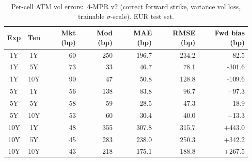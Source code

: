 \begin{table}[H]
\centering
\caption{Per-cell ATM vol errors: $\Lambda$-MPR v2 (correct forward strike, variance vol loss, trainable $\sigma$-scale). EUR test set.}
\label{tab:lambda_v2_per_cell}
\small
\begin{tabular}{@{}ccrrrrr@{}}
\toprule
\textbf{Exp} & \textbf{Ten} & \textbf{Mkt (bp)} & \textbf{Mod (bp)} & \textbf{MAE (bp)} & \textbf{RMSE (bp)} & \textbf{Fwd bias (bp)} \\
\midrule
  1Y & 1Y & 60 & 250 & 196.7 & 234.2 & -82.5 \\
  1Y & 5Y & 73 & 33 & 46.7 & 78.1 & -301.6 \\
  1Y & 10Y & 90 & 47 & 50.8 & 128.8 & -109.6 \\
  \midrule
  5Y & 1Y & 56 & 138 & 83.8 & 96.7 & +97.3 \\
  5Y & 5Y & 58 & 59 & 28.5 & 47.3 & -18.9 \\
  5Y & 10Y & 53 & 60 & 30.4 & 40.0 & +13.3 \\
  \midrule
  10Y & 1Y & 48 & 355 & 307.8 & 315.7 & +443.0 \\
  10Y & 5Y & 45 & 283 & 238.0 & 250.3 & +342.2 \\
  10Y & 10Y & 43 & 218 & 175.1 & 188.8 & +267.5 \\
\bottomrule
\end{tabular}
\end{table}